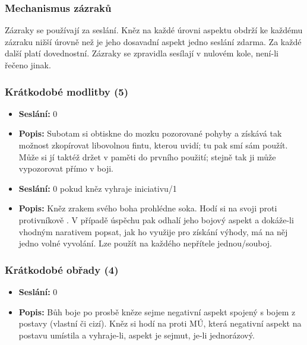 \documentclass[../main.tex]{subfiles}
\begin{document}
\subsubsection{Mechanismus zázraků}
Zázraky se používají za seslání. Kněz na každé úrovni aspektu obdrží ke každému zázraku nižší úrovně než je jeho dosavadní aspekt jedno seslání zdarma. Za každé další platí dovednostní. Zázraky se zpravidla sesílají v nulovém kole, není-li řečeno jinak.

\subsubsection{Krátkodobé modlitby (5)}

\begin{specialita}
\begin{itemize}
	\item \textbf{Seslání:} 0
	\item \textbf{Popis:} Subotam si obtiskne do mozku pozorované pohyby a získává tak možnost zkopírovat libovolnou fintu, kterou uvidí; tu pak smí sám použít. Může si jí taktéž držet v paměti do prvního použití; stejně tak ji může vypozorovat přímo v boji.
\end{itemize}
\end{specialita}

\begin{specialita}
\begin{itemize}
	\item \textbf{Seslání:} 0 pokud kněz vyhraje iniciativu/1
	\item \textbf{Popis:} Kněz zrakem svého boha prohlédne soka. Hodí si na svoji  proti protivníkově . V případě úspěchu pak odhalí jeho bojový aspekt a dokáže-li vhodným narativem popsat, jak ho využije pro získání výhody, má na něj jedno volné vyvolání. Lze použít na každého nepřítele jednou/souboj.
\end{itemize}
\end{specialita}

\subsubsection{Krátkodobé obřady (4)}

\begin{specialita}
\begin{itemize}
	\item \textbf{Seslání:} 0
	\item \textbf{Popis:} Bůh boje po prosbě kněze sejme negativní aspekt spojený s bojem z postavy (vlastní či cizí). Kněz si hodí na  proti MÚ, která negativní aspekt na postavu umístila a vyhraje-li, aspekt je sejmut, je-li jednorázový.
\end{itemize}
\end{specialita}
\end{document}
